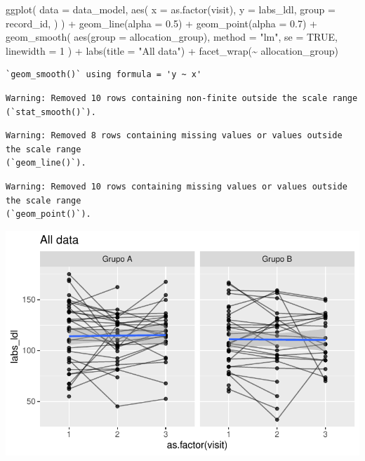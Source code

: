 \documentclass[
  letterpaper,
  DIV=11,
  numbers=noendperiod]{scrartcl}
\newenvironment{Shaded}{\begin{snugshade}}{\end{snugshade}}
\newcommand{\AttributeTok}[1]{\textcolor[rgb]{0.40,0.45,0.13}{#1}}
\newcommand{\ConstantTok}[1]{\textcolor[rgb]{0.56,0.35,0.01}{#1}}
\newcommand{\DecValTok}[1]{\textcolor[rgb]{0.68,0.00,0.00}{#1}}
\newcommand{\FloatTok}[1]{\textcolor[rgb]{0.68,0.00,0.00}{#1}}
\newcommand{\FunctionTok}[1]{\textcolor[rgb]{0.28,0.35,0.67}{#1}}
\newcommand{\NormalTok}[1]{\textcolor[rgb]{0.00,0.23,0.31}{#1}}
\newcommand{\SpecialCharTok}[1]{\textcolor[rgb]{0.37,0.37,0.37}{#1}}
\newcommand{\StringTok}[1]{\textcolor[rgb]{0.13,0.47,0.30}{#1}}
\begin{document}
\begin{Shaded}
\begin{Highlighting}[]
\FunctionTok{ggplot}\NormalTok{(}
    \AttributeTok{data =}\NormalTok{ data\_model, }
    \FunctionTok{aes}\NormalTok{(}
        \AttributeTok{x =} \FunctionTok{as.factor}\NormalTok{(visit),}
        \AttributeTok{y =}\NormalTok{ labs\_ldl,}
        \AttributeTok{group =}\NormalTok{ record\_id,}
\NormalTok{    )}
\NormalTok{) }\SpecialCharTok{+}
    \FunctionTok{geom\_line}\NormalTok{(}\AttributeTok{alpha =} \FloatTok{0.5}\NormalTok{) }\SpecialCharTok{+}
    \FunctionTok{geom\_point}\NormalTok{(}\AttributeTok{alpha =} \FloatTok{0.7}\NormalTok{) }\SpecialCharTok{+}
    \FunctionTok{geom\_smooth}\NormalTok{(}
        \FunctionTok{aes}\NormalTok{(}\AttributeTok{group =}\NormalTok{ allocation\_group),}
        \AttributeTok{method =} \StringTok{"lm"}\NormalTok{,}
        \AttributeTok{se =} \ConstantTok{TRUE}\NormalTok{,}
        \AttributeTok{linewidth =} \DecValTok{1}
\NormalTok{    ) }\SpecialCharTok{+}
    \FunctionTok{labs}\NormalTok{(}\AttributeTok{title =} \StringTok{"All data"}\NormalTok{) }\SpecialCharTok{+}
    \FunctionTok{facet\_wrap}\NormalTok{(}\SpecialCharTok{\textasciitilde{}}\NormalTok{ allocation\_group) }
\end{Highlighting}
\end{Shaded}

\begin{verbatim}
`geom_smooth()` using formula = 'y ~ x'
\end{verbatim}

\begin{verbatim}
Warning: Removed 10 rows containing non-finite outside the scale range
(`stat_smooth()`).
\end{verbatim}

\begin{verbatim}
Warning: Removed 8 rows containing missing values or values outside the scale range
(`geom_line()`).
\end{verbatim}

\begin{verbatim}
Warning: Removed 10 rows containing missing values or values outside the scale range
(`geom_point()`).
\end{verbatim}

\includegraphics{Outcomes_V1V2V3_files/figure-pdf/labs_ldl_6-1.pdf}
\end{document}
